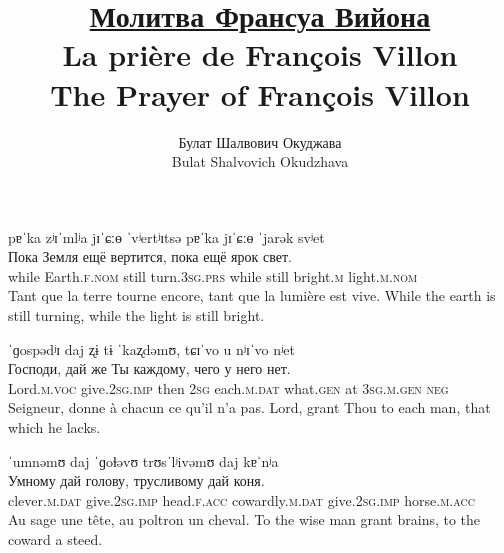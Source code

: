 \documentclass[12pt]{article}
\begin{document}
\title{
    \href{https://youtu.be/yCnlaBJRKcE}{Молитва Франсуа Вийона}
    \\
    La prière de François Villon
    \\
    The Prayer of François Villon
    }
\author{Булат Шалвович Окуджава\\Bulat Shalvovich Okudzhava}
\date{}
\maketitle

\dotfill

\begin{exe}
    \glll    
    pɐˈka zʲɪˈmlʲa jɪˈɕːɵ ˈvʲertʲɪtsə pɐˈka jɪˈɕːɵ ˈjarək svʲet\\
    Пока Земля ещё вертится, пока ещё ярок свет.\\
    while Earth.\textsc{f.nom} still turn.3\textsc{sg.prs} while still bright.\textsc{m} light.\textsc{m.nom}\\
    \trans
    Tant que la terre tourne encore, tant que la lumière est vive.
    \trans
    While the earth is still turning, while the light is still bright.
\end{exe}

\begin{exe}
    \glll
    ˈɡospədʲɪ daj ʐɨ tɨ ˈkaʐdəmʊ, tɕɪˈvo u nʲɪˈvo nʲet\\
    Господи, дай же Ты каждому, чего у него нет.\\
    Lord.\textsc{m.voc} give.2\textsc{sg.imp} then 2\textsc{sg} each.\textsc{m.dat} what.\textsc{gen} at 3\textsc{sg.m.gen} \textsc{neg}\\
    \trans
    Seigneur, donne à chacun ce qu'il n'a pas.
    \trans
    Lord, grant Thou to each man, that which he lacks.
\end{exe}

\begin{exe}
    \glll
    ˈumnəmʊ daj ˈɡoɫəvʊ trʊsˈlʲivəmʊ daj kɐˈnʲa\\
    Умному дай голову, трусливому дай коня.\\
    clever.\textsc{m.dat} give.2\textsc{sg.imp} head.\textsc{f.acc} cowardly.\textsc{m.dat} give.2\textsc{sg.imp} horse.\textsc{m.acc}\\
    \trans
    Au sage une tête, au poltron un cheval.
    \trans
    To the wise man grant brains, to the coward a steed.
\end{exe}
\end{document}
